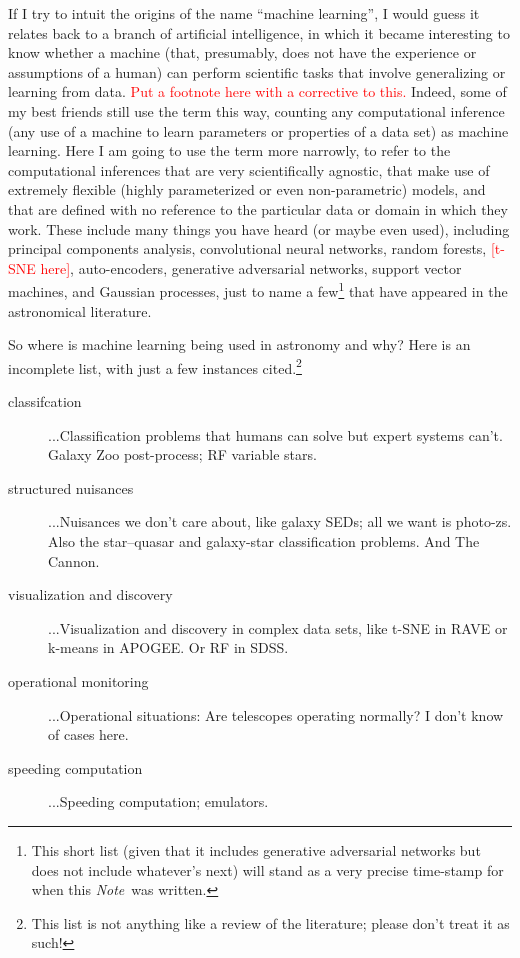 \documentclass[12pt, letterpaper]{article}
\newcommand{\documentname}{\textsl{Note}}
\newcommand{\todo}[1]{\textcolor{red}{#1}}  %
\begin{document}
If I try to intuit the origins of the name ``machine learning'',
I would guess it relates back to a branch of artificial intelligence,
in which it became interesting to know whether a machine (that,
presumably, does not have the experience or assumptions of a human)
can perform scientific tasks that involve generalizing or learning from
data. \todo{Put a footnote here with a corrective to this.}
Indeed, some of my best friends still use the term
this way, counting any computational inference (any use of a machine
to learn parameters or properties of a data set) as machine learning.
Here I am going to use the term more narrowly, to refer to the computational
inferences that are very scientifically agnostic, that make use of extremely
flexible (highly parameterized or even non-parametric) models, and
that are defined with no reference to the particular data or domain in
which they work.
These include many things you have heard (or maybe even used),
including principal components analysis, convolutional neural
networks, random forests, \todo{[t-SNE here]}, auto-encoders,
generative adversarial networks, support vector machines,
and Gaussian processes,
just to name a few\footnote{This short list (given
  that it includes generative adversarial networks but does not
  include whatever's next) will stand as a very precise time-stamp for
  when this \documentname\ was written.}
that have appeared in the astronomical literature.

So where is machine learning being used in astronomy and why?  Here is
an incomplete list, with just a few instances cited.\footnote{This
  list is not anything like a review of the literature; please don't
  treat it as such!}
\begin{description}
\item[classifcation]
...Classification problems that humans can solve but expert systems
can't. Galaxy Zoo post-process; RF variable stars.
\item[structured nuisances]
...Nuisances we don't care about, like galaxy SEDs; all we want is
photo-zs. Also the star--quasar and galaxy-star classification
problems. And The Cannon.
\item[visualization and discovery]
...Visualization and discovery in complex data sets, like t-SNE in RAVE
or k-means in APOGEE. Or RF in SDSS.
\item[operational monitoring]
...Operational situations: Are telescopes operating normally? I don't know
of cases here.
\item[speeding computation]
...Speeding computation; emulators.
\end{description}
\end{document}
